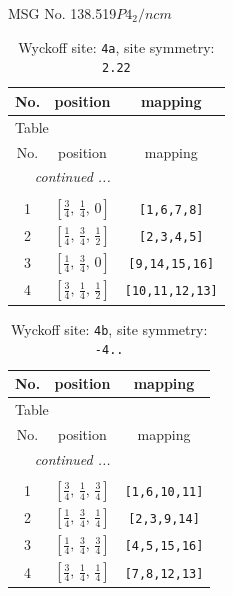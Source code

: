 \documentclass[fleqn,8pt]{jsarticle}
\begin{document}
\setcounter{MaxMatrixCols}{32}

\renewcommand{\tablename}{Table~}
\renewcommand{\figurename}{Figure~}
\begin{center}
\LARGE
MSG No. 138.519\quad$P4_{2}/ncm$
\end{center}
\renewcommand{\arraystretch}{1.2}
\begin{longtable}{ccc}
\caption{Wyckoff site: {\tt 4a}, site symmetry: {\tt 2.22}}
 \\
 \hline \hline
No. & position & mapping \\ \hline \endfirsthead

\multicolumn{2}{l}{\tablename\ \thetable{}} \\
 \hline \hline
No. & position & mapping \\ \hline \endhead

 \hline \hline
\multicolumn{2}{r}{\footnotesize\it continued ...} \\ \endfoot

 \hline \hline
\multicolumn{2}{r}{} \\ \endlastfoot

1 & $\left[ \frac{3}{4},\, \frac{1}{4},\, 0 \right]$ & {\tt [1,6,7,8]} \\ \hline
2 & $\left[ \frac{1}{4},\, \frac{3}{4},\, \frac{1}{2} \right]$ & {\tt [2,3,4,5]} \\ \hline
3 & $\left[ \frac{1}{4},\, \frac{3}{4},\, 0 \right]$ & {\tt [9,14,15,16]} \\ \hline
4 & $\left[ \frac{3}{4},\, \frac{1}{4},\, \frac{1}{2} \right]$ & {\tt [10,11,12,13]} \\
\end{longtable}
\renewcommand{\arraystretch}{1.2}
\begin{longtable}{ccc}
\caption{Wyckoff site: {\tt 4b}, site symmetry: {\tt -4..}}
 \\
 \hline \hline
No. & position & mapping \\ \hline \endfirsthead

\multicolumn{2}{l}{\tablename\ \thetable{}} \\
 \hline \hline
No. & position & mapping \\ \hline \endhead

 \hline \hline
\multicolumn{2}{r}{\footnotesize\it continued ...} \\ \endfoot

 \hline \hline
\multicolumn{2}{r}{} \\ \endlastfoot

1 & $\left[ \frac{3}{4},\, \frac{1}{4},\, \frac{3}{4} \right]$ & {\tt [1,6,10,11]} \\ \hline
2 & $\left[ \frac{1}{4},\, \frac{3}{4},\, \frac{1}{4} \right]$ & {\tt [2,3,9,14]} \\ \hline
3 & $\left[ \frac{1}{4},\, \frac{3}{4},\, \frac{3}{4} \right]$ & {\tt [4,5,15,16]} \\ \hline
4 & $\left[ \frac{3}{4},\, \frac{1}{4},\, \frac{1}{4} \right]$ & {\tt [7,8,12,13]} \\
\end{longtable}
\end{document}
